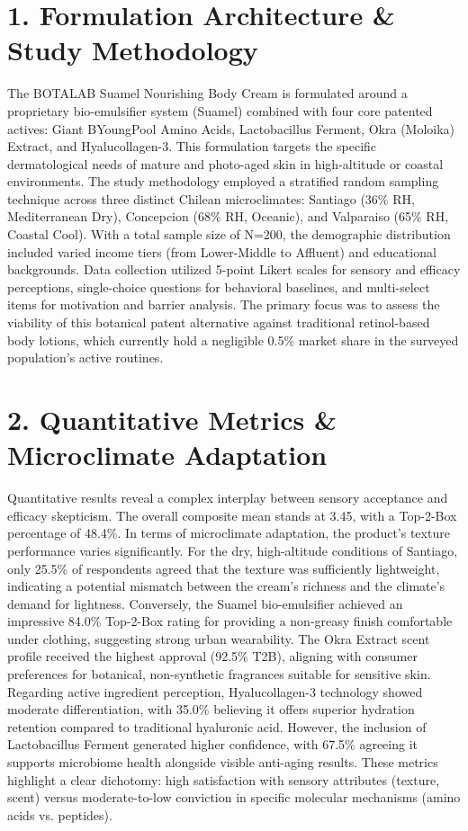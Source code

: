 \documentclass[10pt,twocolumn,a4paper]{article}
\begin{document}
\section{1. Formulation Architecture \& Study Methodology}
The BOTALAB Suamel Nourishing Body Cream is formulated around a proprietary bio-emulsifier system (Suamel) combined with four core patented actives: Giant BYoungPool Amino Acids, Lactobacillus Ferment, Okra (Moloika) Extract, and Hyalucollagen-3. This formulation targets the specific dermatological needs of mature and photo-aged skin in high-altitude or coastal environments. The study methodology employed a stratified random sampling technique across three distinct Chilean microclimates: Santiago (36\% RH, Mediterranean Dry), Concepcion (68\% RH, Oceanic), and Valparaiso (65\% RH, Coastal Cool). With a total sample size of N=200, the demographic distribution included varied income tiers (from Lower-Middle to Affluent) and educational backgrounds. Data collection utilized 5-point Likert scales for sensory and efficacy perceptions, single-choice questions for behavioral baselines, and multi-select items for motivation and barrier analysis. The primary focus was to assess the viability of this botanical patent alternative against traditional retinol-based body lotions, which currently hold a negligible 0.5\% market share in the surveyed population's active routines.
\section{2. Quantitative Metrics \& Microclimate Adaptation}
Quantitative results reveal a complex interplay between sensory acceptance and efficacy skepticism. The overall composite mean stands at 3.45, with a Top-2-Box percentage of 48.4\%. In terms of microclimate adaptation, the product's texture performance varies significantly. For the dry, high-altitude conditions of Santiago, only 25.5\% of respondents agreed that the texture was sufficiently lightweight, indicating a potential mismatch between the cream's richness and the climate's demand for lightness. Conversely, the Suamel bio-emulsifier achieved an impressive 84.0\% Top-2-Box rating for providing a non-greasy finish comfortable under clothing, suggesting strong urban wearability. The Okra Extract scent profile received the highest approval (92.5\% T2B), aligning with consumer preferences for botanical, non-synthetic fragrances suitable for sensitive skin. Regarding active ingredient perception, Hyalucollagen-3 technology showed moderate differentiation, with 35.0\% believing it offers superior hydration retention compared to traditional hyaluronic acid. However, the inclusion of Lactobacillus Ferment generated higher confidence, with 67.5\% agreeing it supports microbiome health alongside visible anti-aging results. These metrics highlight a clear dichotomy: high satisfaction with sensory attributes (texture, scent) versus moderate-to-low conviction in specific molecular mechanisms (amino acids vs. peptides).
\end{document}
